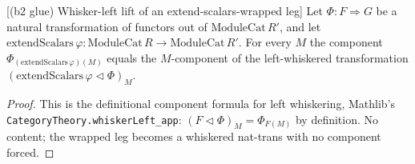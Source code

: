 \begin{lemma}

[(b2 glue) Whisker-left lift of an extend-scalars-wrapped leg]
  \label{lem:ring_square_glue_whiskerLeft_lift}
  Let \(\Phi : F \Rightarrow G\) be a natural transformation of functors out of
  \(\mathrm{ModuleCat}\,R'\), and let \(\mathrm{extendScalars}\,\varphi : \mathrm{ModuleCat}\,R \to
  \mathrm{ModuleCat}\,R'\). For every \(M\) the component
  \(\Phi_{(\mathrm{extendScalars}\,\varphi)(M)}\) equals the \(M\)-component of the left-whiskered
  transformation \((\mathrm{extendScalars}\,\varphi \lhd \Phi)_M\).
  \begin{proof}
    This is the definitional component formula for left whiskering, Mathlib's
    \texttt{CategoryTheory.whiskerLeft\_app}: \((F \lhd \Phi)_M = \Phi_{F(M)}\) by definition. No
    content; the wrapped leg becomes a whiskered nat-trans with no component forced.
  \end{proof}
\end{lemma}

